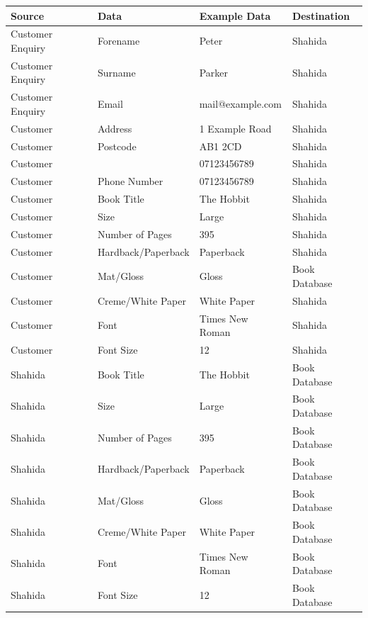 \begin{center}
\begin{tabular}{|p{3.5cm}|p{3.5cm}|p{3cm}|p{3cm}|}
    \hline
    \textbf{Source} & \textbf{Data} & \textbf{Example Data} & \textbf{Destination} \\ \hline
    Customer Enquiry & Forename & Peter & Shahida  \\ \hline
    Customer Enquiry & Surname & Parker & Shahida  \\ \hline
    Customer Enquiry & Email & mail@example.com & Shahida  \\ \hline
    Customer & Address & 1 Example Road & Shahida  \\ \hline
    Customer & Postcode & AB1 2CD & Shahida  \\ \hline
    Customer &  & 07123456789 & Shahida  \\ \hline
    Customer & Phone Number & 07123456789 & Shahida  \\ \hline
    Customer & Book Title & The Hobbit & Shahida \\  \hline
    Customer & Size & Large & Shahida \\  \hline
    Customer & Number of Pages & 395 & Shahida \\  \hline
    Customer & Hardback/Paperback & Paperback & Shahida \\  \hline
    Customer & Mat/Gloss & Gloss & Book Database \\  \hline
    Customer & Creme/White Paper & White Paper & Shahida \\  \hline
    Customer & Font & Times New Roman & Shahida \\  \hline
    Customer & Font Size & 12 & Shahida \\  \hline
    Shahida & Book Title & The Hobbit & Book Database \\  \hline
    Shahida & Size & Large & Book Database \\  \hline
    Shahida & Number of Pages & 395 & Book Database \\  \hline
    Shahida & Hardback/Paperback & Paperback & Book Database \\  \hline
    Shahida & Mat/Gloss & Gloss & Book Database \\  \hline
    Shahida & Creme/White Paper & White Paper & Book Database \\  \hline
    Shahida & Font & Times New Roman & Book Database \\  \hline
    Shahida & Font Size & 12 & Book Database \\  \hline

\end{tabular}
\end{center}
